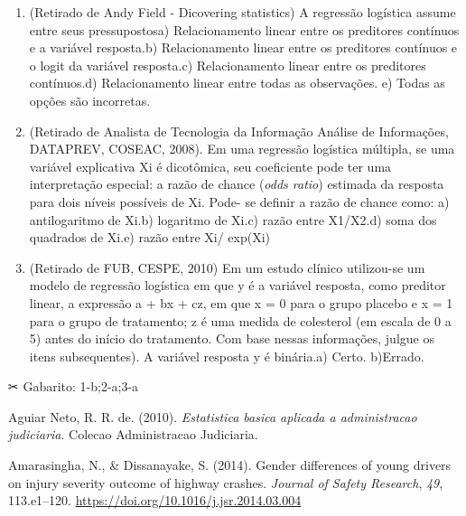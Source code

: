 \documentclass[
]{book}
\begin{document}
\begin{question}

\begin{enumerate}
\def\labelenumi{\arabic{enumi}.}
\item
  (Retirado de Andy Field - Dicovering statistics) A regressão logística
  assume entre seus pressupostosa) Relacionamento linear entre os
  preditores contínuos e a variável resposta.b) Relacionamento linear
  entre os preditores contínuos e o logit da variável resposta.c)
  Relacionamento linear entre os preditores contínuos.d) Relacionamento
  linear entre todas as observações. e) Todas as opções são incorretas.
\item
  (Retirado de Analista de Tecnologia da Informação Análise de
  Informações, DATAPREV, COSEAC, 2008). Em uma regressão logística
  múltipla, se uma variável explicativa Xi é dicotômica, seu coeficiente
  pode ter uma interpretação especial: a razão de chance (\emph{odds
  ratio}) estimada da resposta para dois níveis possíveis de Xi. Pode-
  se definir a razão de chance como: a) antilogaritmo de Xi.b) logaritmo
  de Xi.c) razão entre X1/X2.d) soma dos quadrados de Xi.e) razão entre
  Xi/ exp(Xi)
\item
  (Retirado de FUB, CESPE, 2010) Em um estudo clínico utilizou-se um
  modelo de regressão logística em que y é a variável resposta, como
  preditor linear, a expressão a + bx + cz, em que x = 0 para o grupo
  placebo e x = 1 para o grupo de tratamento; z é uma medida de
  colesterol (em escala de 0 a 5) antes do início do tratamento. Com
  base nessas informações, julgue os itens subsequentes). A variável
  resposta y é binária.a) Certo. b)Errado.
\end{enumerate}

\end{question}

\begin{mirror}

✂ Gabarito: 1-b;2-a;3-a

\end{mirror}

\hypertarget{refs}{}
\leavevmode\hypertarget{ref-neto2010}{}%
Aguiar Neto, R. R. de. (2010). \emph{Estatistica basica aplicada a
administracao judiciaria}. Colecao Administracao Judiciaria.

\leavevmode\hypertarget{ref-Amarasingha2014}{}%
Amarasingha, N., \& Dissanayake, S. (2014). Gender differences of young
drivers on injury severity outcome of highway crashes. \emph{Journal of
Safety Research}, \emph{49}, 113.e1--120.
\url{https://doi.org/10.1016/j.jsr.2014.03.004}
\end{document}
